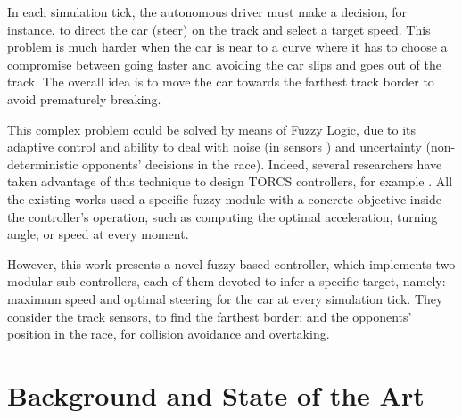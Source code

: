 \documentclass[runningheads,a4paper]{llncs}
\begin{document}
	In each simulation tick, the autonomous driver must make a decision,
	for instance, to direct the car (steer) on the track and select a
	target speed. This problem is much harder when the car is near to a
	curve where it has to choose a compromise between going faster and
	avoiding the car slips and goes out of the track. The overall idea is
	to move the car towards the farthest track border to avoid prematurely
	breaking. 
	
	This complex problem could be solved by means of Fuzzy Logic, due to
	its adaptive control and ability to deal with noise (in sensors
	\cite{manualTORCS}) and uncertainty (non-deterministic opponents'
	decisions in the race). Indeed, several researchers have taken advantage of this technique to design TORCS controllers, for example \cite{CarRacing_Pelta09,PerezEvolvingFuzzy09,torcs2012}. 
	All the existing works used a specific fuzzy module with a concrete objective inside the controller's operation, such as computing the optimal acceleration, turning angle, or speed at every moment.
	
	However, this work presents a novel fuzzy-based controller, which implements two modular sub-controllers, each of them devoted to infer a specific target, namely: maximum speed and optimal steering for the car at every simulation tick.
	They consider the track sensors, to find the farthest border; and the opponents' position in the race, for collision avoidance and overtaking. 
	
	
	
	\section{Background and State of the Art}
	\label{sec:soa}
	
\end{document}
